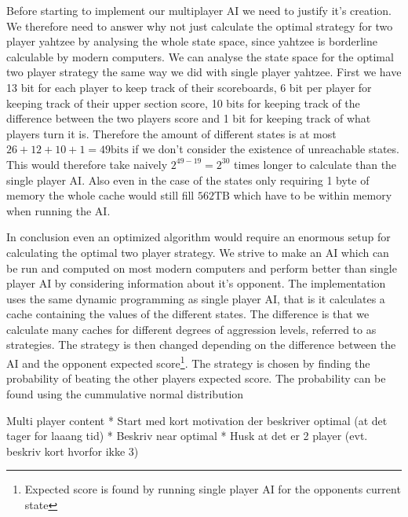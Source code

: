 Before starting to implement our multiplayer AI we need to justify it's creation. We therefore need to answer why not just calculate the optimal strategy for two player yahtzee by analysing the whole state space, since yahtzee is borderline calculable by modern computers. We can analyse the state space for the optimal two player strategy the same way we did with single player yahtzee. First we have 13 bit for each player to keep track of their scoreboards, 6 bit per player for keeping track of their upper section score, 10 bits for keeping track of the difference between the two players score and 1 bit for keeping track of what players turn it is. Therefore the amount of different states is at most $26+12+10+1 = 49\mbox{bits}$ if we don't consider the existence of unreachable states. This would therefore take naively $2^{49-19} = 2^{30}$ times longer to calculate than the single player AI. Also even in the case of the states only requiring 1 byte of memory the whole cache would still fill $562 \mbox{TB}$ which have to be within memory when running the AI. 

In conclusion even an optimized algorithm would require an enormous setup for calculating the optimal two player strategy. We strive to make an AI which can be run and computed on most modern computers and perform better than single player AI by considering information about it's opponent. The implementation uses the same dynamic programming as single player AI, that is it calculates a cache containing the values of the different states. The difference is that we calculate many caches for different degrees of aggression levels, referred to as strategies. The strategy is then changed depending on the difference between the AI and the opponent expected score\footnote{Expected score is found by running single player AI for the opponents current state}. The strategy is chosen by finding the probability of beating the other players expected score. The probability can be found using the cummulative normal distribution 

Multi player content
* Start med kort motivation der beskriver optimal (at det tager for laaang tid)
* Beskriv near optimal
* Husk at det er 2 player (evt. beskriv kort hvorfor ikke 3)
